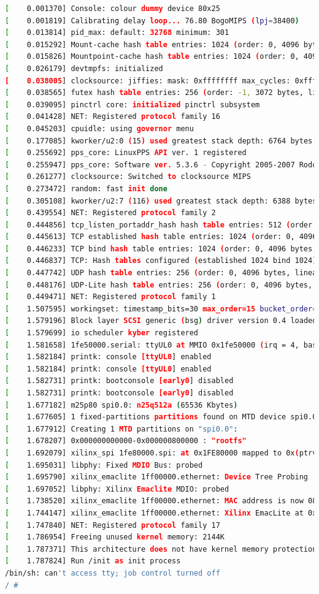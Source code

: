 \documentclass[lang=cn,11pt,a4paper]{elegantpaper}
\begin{document}
\begin{lstlisting}[language=bash]
[    0.001370] Console: colour dummy device 80x25
[    0.001819] Calibrating delay loop... 76.80 BogoMIPS (lpj=38400)
[    0.013814] pid_max: default: 32768 minimum: 301
[    0.015292] Mount-cache hash table entries: 1024 (order: 0, 4096 bytes, linear)
[    0.015826] Mountpoint-cache hash table entries: 1024 (order: 0, 4096 bytes, linear)
[    0.026179] devtmpfs: initialized
[    0.038005] clocksource: jiffies: mask: 0xffffffff max_cycles: 0xffffffff, max_idle_ns: 1911260446275000 ns
[    0.038565] futex hash table entries: 256 (order: -1, 3072 bytes, linear)
[    0.039095] pinctrl core: initialized pinctrl subsystem
[    0.041428] NET: Registered protocol family 16
[    0.045203] cpuidle: using governor menu
[    0.177085] kworker/u2:0 (15) used greatest stack depth: 6764 bytes left
[    0.255692] pps_core: LinuxPPS API ver. 1 registered
[    0.255947] pps_core: Software ver. 5.3.6 - Copyright 2005-2007 Rodolfo Giometti <giometti@linux.it>
[    0.261277] clocksource: Switched to clocksource MIPS
[    0.273472] random: fast init done
[    0.305108] kworker/u2:7 (116) used greatest stack depth: 6388 bytes left
[    0.439554] NET: Registered protocol family 2
[    0.444856] tcp_listen_portaddr_hash hash table entries: 512 (order: 0, 4096 bytes, linear)
[    0.445613] TCP established hash table entries: 1024 (order: 0, 4096 bytes, linear)
[    0.446233] TCP bind hash table entries: 1024 (order: 0, 4096 bytes, linear)
[    0.446837] TCP: Hash tables configured (established 1024 bind 1024)
[    0.447742] UDP hash table entries: 256 (order: 0, 4096 bytes, linear)
[    0.448176] UDP-Lite hash table entries: 256 (order: 0, 4096 bytes, linear)
[    0.449471] NET: Registered protocol family 1
[    1.507595] workingset: timestamp_bits=30 max_order=15 bucket_order=0
[    1.579196] Block layer SCSI generic (bsg) driver version 0.4 loaded (major 252)
[    1.579699] io scheduler kyber registered
[    1.581658] 1fe50000.serial: ttyUL0 at MMIO 0x1fe50000 (irq = 4, base_baud = 0) is a uartlite
[    1.582184] printk: console [ttyUL0] enabled
[    1.582184] printk: console [ttyUL0] enabled
[    1.582731] printk: bootconsole [early0] disabled
[    1.582731] printk: bootconsole [early0] disabled
[    1.677182] m25p80 spi0.0: n25q512a (65536 Kbytes)
[    1.677605] 1 fixed-partitions partitions found on MTD device spi0.0
[    1.677912] Creating 1 MTD partitions on "spi0.0":
[    1.678207] 0x000000000000-0x000000800000 : "rootfs"
[    1.692079] xilinx_spi 1fe80000.spi: at 0x1FE80000 mapped to 0x(ptrval), irq=5
[    1.695031] libphy: Fixed MDIO Bus: probed
[    1.695790] xilinx_emaclite 1ff00000.ethernet: Device Tree Probing
[    1.697052] libphy: Xilinx Emaclite MDIO: probed
[    1.738520] xilinx_emaclite 1ff00000.ethernet: MAC address is now 08:86:4c:0d:f7:09
[    1.744147] xilinx_emaclite 1ff00000.ethernet: Xilinx EmacLite at 0x1FF00000 mapped to 0xBFF00000, irq=6
[    1.747840] NET: Registered protocol family 17
[    1.786954] Freeing unused kernel memory: 2144K
[    1.787371] This architecture does not have kernel memory protection.
[    1.787824] Run /init as init process
/bin/sh: can't access tty; job control turned off
/ #
\end{lstlisting}
\end{document}
